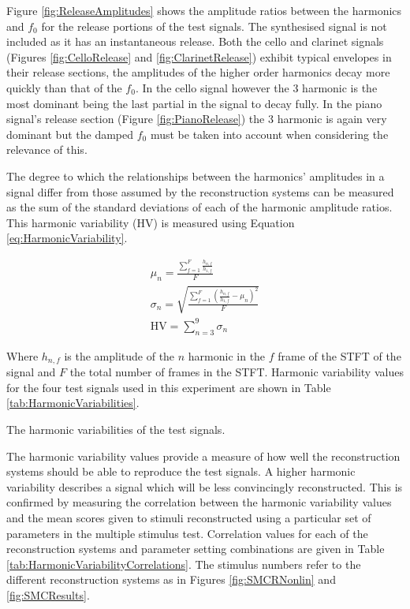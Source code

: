 		Figure \ref{fig:ReleaseAmplitudes} shows the amplitude ratios between the harmonics and $f_{0}$ for the
		release portions of the test signals. The synthesised signal is not included as it has an instantaneous
		release. Both the cello and clarinet signals (Figures \ref{fig:CelloRelease} and \ref{fig:ClarinetRelease})
		exhibit typical envelopes in their release sections, the amplitudes of the higher order harmonics decay
		more quickly than that of the $f_{0}$. In the cello signal however the 3 harmonic is the most
		dominant being the last partial in the signal to decay fully. In the piano signal's release section (Figure
		\ref{fig:PianoRelease}) the 3 harmonic is again very dominant but the damped $f_{0}$ must be
		taken into account when considering the relevance of this.

		The degree to which the relationships between the harmonics' amplitudes in a signal differ from those
		assumed by the reconstruction systems can be measured as the sum of the standard deviations of each of the
		harmonic amplitude ratios. This harmonic variability ($\mathrm{HV}$) is measured using Equation
		\ref{eq:HarmonicVariability}. 		
		
		\begin{gather}
			\mu_{n} = \frac{\sum_{f = 1}^{F} \frac{h_{n,f}}{h_{1,f}}}{F} \nonumber \\
			\sigma_{n} = \sqrt{\frac{\sum_{f = 1}^{F} 
					         \left(\frac{h_{n,f}}{h_{1,f}} - \mu_{n} \right)^{2}}{F}} \nonumber \\
			\mathrm{HV} = \sum_{n = 3}^{9} \sigma_{n}
			\label{eq:HarmonicVariability}
		\end{gather}

		Where $h_{n,f}$ is the amplitude of the $n$ harmonic in the $f$ frame of the STFT of
		the signal and $F$ the total number of frames in the STFT. Harmonic variability values for the four test
		signals used in this experiment are shown in Table \ref{tab:HarmonicVariabilities}.

		\begin{table}[h!]
			\centering
			
			\caption{The harmonic variabilities of the test signals.}
			\label{tab:HarmonicVariabilities}
		\end{table}

		The harmonic variability values provide a measure of how well the reconstruction systems should be able to
		reproduce the test signals. A higher harmonic variability describes a signal which will be less
		convincingly reconstructed. This is confirmed by measuring the correlation between the harmonic variability
		values and the mean scores given to stimuli reconstructed using a particular set of parameters in the
		multiple stimulus test. Correlation values for each of the reconstruction systems and parameter setting
		combinations are given in Table \ref{tab:HarmonicVariabilityCorrelations}. The stimulus numbers refer to
		the different reconstruction systems as in Figures \ref{fig:SMCRNonlin} and \ref{fig:SMCResults}.

